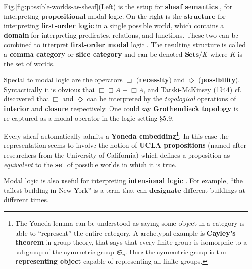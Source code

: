 \documentclass[runningheads]{llncs}
\begin{document}
Fig.\ref{fig:possible-worlds-as-sheaf}(Left) is the setup for \textbf{sheaf semantics} \cite{Goldblatt1984} \cite{Bell1988}, for interpreting \textbf{propositional} modal logic.   On the right is the \textbf{structure} for interpreting \textbf{first-order logic} in a single possible world, which contains a \textbf{domain} for interpreting predicates, relations, and functions.  These two can be combined to interpret \textbf{first-order modal} logic \cite{Awodey2007} \cite{Awodey2014}. The resulting structure is called a \textbf{comma category} \cite{MacLane1997} or \textbf{slice category} and can be denoted $\mathbf{Sets}/K$ where $K$ is the set of worlds.

Special to modal logic are the operators $\Box$ (\textbf{necessity}) and $\Diamond$ (\textbf{possibility}).  Syntactically it is obvious that $\Box \Box A \equiv \Box A$, and Tarski-McKinsey (1944) cf. \cite{Dunn2001} discovered that $\Box$ and $\Diamond$ can be interpreted by the \textit{topological} operations of \textbf{interior} and \textbf{closure} respectively.  %
One could say \textbf{Grothendieck topology} is re-captured as a modal operator in the logic setting \cite{Rodin2014} \S5.9.

Every sheaf automatically admits a \textbf{Yoneda embedding}\footnote{The Yoneda lemma can be understood as saying some object in a category is able to ``represent'' the entire category.  A archetypal example is \textbf{Cayley's theorem} in group theory, that says that every finite group is isomorphic to a subgroup of the symmetric group $\mathfrak{S}_n$. Here the symmetric group is the \textbf{representing object} capable of representing all finite groups.}.  In this case the representation seems to involve the notion of \textbf{UCLA propositions} \cite{Dunn2001} (named after researchers from the University of California) which defines a proposition as \textit{equivalent} to the \textbf{set} of possible worlds in which it is true.

Modal logic is also useful for interpreting \textbf{intensional logic} \cite{Stanford2022-intension}.  For example, ``the tallest building in New York'' is a term that can \textbf{designate} different buildings at different times.
\end{document}
